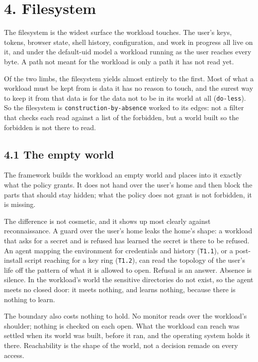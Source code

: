 \hypertarget{filesystem}{%
\chapter{4. Filesystem}\label{filesystem}}

The filesystem is the widest surface the workload touches. The user's
keys, tokens, browser state, shell history, configuration, and work in
progress all live on it, and under the default-uid model a workload
running as the user reaches every byte. A path not meant for the
workload is only a path it has not read yet.

Of the two limbs, the filesystem yields almost entirely to the first.
Most of what a workload must be kept from is data it has no reason to
touch, and the surest way to keep it from that data is for the data not
to be in its world at all (\texttt{do-less}). So the filesystem is
\texttt{construction-by-absence} worked to its edges: not a filter that
checks each read against a list of the forbidden, but a world built so
the forbidden is not there to read.

\hypertarget{the-empty-world}{%
\section{4.1 The empty world}\label{the-empty-world}}

The framework builds the workload an empty world and places into it
exactly what the policy grants. It does not hand over the user's home
and then block the parts that should stay hidden; what the policy does
not grant is not forbidden, it is missing.

The difference is not cosmetic, and it shows up most clearly against
reconnaissance. A guard over the user's home leaks the home's shape: a
workload that asks for a secret and is refused has learned the secret is
there to be refused. An agent mapping the environment for credentials
and history (\texttt{T1.1}), or a post-install script reaching for a key
ring (\texttt{T1.2}), can read the topology of the user's life off the
pattern of what it is allowed to open. Refusal is an answer. Absence is
silence. In the workload's world the sensitive directories do not exist,
so the agent meets no closed door: it meets nothing, and learns nothing,
because there is nothing to learn.

The boundary also costs nothing to hold. No monitor reads over the
workload's shoulder; nothing is checked on each open. What the workload
can reach was settled when its world was built, before it ran, and the
operating system holds it there. Reachability is the shape of the world,
not a decision remade on every access.

